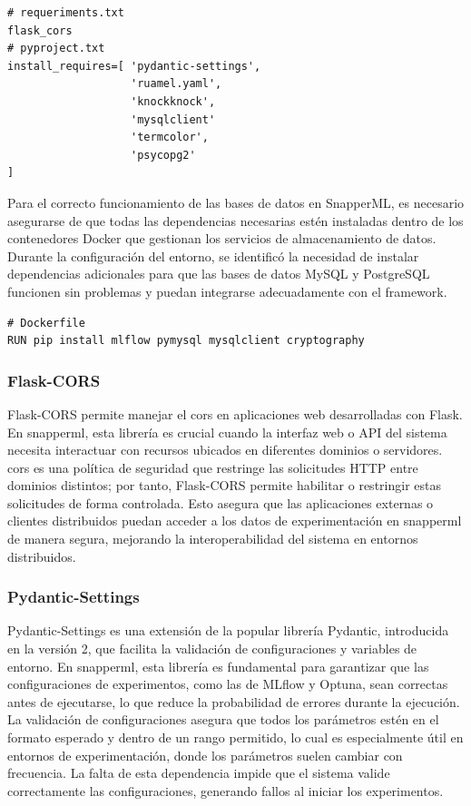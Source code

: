 \begin{verbatim}
# requeriments.txt
flask_cors
# pyproject.txt
install_requires=[ 'pydantic-settings',
                   'ruamel.yaml',
                   'knockknock',
                   'mysqlclient'
                   'termcolor',
                   'psycopg2'
]
\end{verbatim}
Para el correcto funcionamiento de las bases de datos en SnapperML, es necesario asegurarse de que todas las dependencias necesarias estén instaladas dentro de los contenedores Docker que gestionan los servicios de almacenamiento de datos. Durante la configuración del entorno, se identificó la necesidad de instalar dependencias adicionales para que las bases de datos MySQL y PostgreSQL funcionen sin problemas y puedan integrarse adecuadamente con el framework.
\begin{verbatim}
# Dockerfile
RUN pip install mlflow pymysql mysqlclient cryptography
\end{verbatim}

\subsubsection{Flask-CORS}
Flask-CORS permite manejar el \Gls{cors} en aplicaciones web desarrolladas con Flask. En \Gls{snapperml}, esta librería es crucial cuando la interfaz web o API del sistema necesita interactuar con recursos ubicados en diferentes dominios o servidores. \Gls{cors} es una política de seguridad que restringe las solicitudes HTTP entre dominios distintos; por tanto, Flask-CORS permite habilitar o restringir estas solicitudes de forma controlada. Esto asegura que las aplicaciones externas o clientes distribuidos puedan acceder a los datos de experimentación en \Gls{snapperml} de manera segura, mejorando la interoperabilidad del sistema en entornos distribuidos.

\subsubsection{Pydantic-Settings}
Pydantic-Settings es una extensión de la popular librería Pydantic, introducida en la versión 2, que facilita la validación de configuraciones y variables de entorno. En \Gls{snapperml}, esta librería es fundamental para garantizar que las configuraciones de experimentos, como las de MLflow y Optuna, sean correctas antes de ejecutarse, lo que reduce la probabilidad de errores durante la ejecución. La validación de configuraciones asegura que todos los parámetros estén en el formato esperado y dentro de un rango permitido, lo cual es especialmente útil en entornos de experimentación, donde los parámetros suelen cambiar con frecuencia. La falta de esta dependencia impide que el sistema valide correctamente las configuraciones, generando fallos al iniciar los experimentos.

